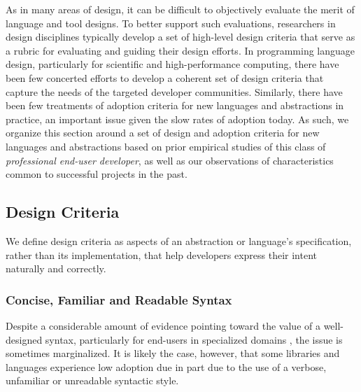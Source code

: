\documentclass[12pt]{article}
\begin{document}

As in many areas of design, it can be difficult to objectively evaluate the merit of language and tool designs. To better support such evaluations, researchers in design disciplines typically develop a set of high-level  design criteria that serve as a rubric for evaluating and guiding their design efforts. In programming language design, particularly for scientific and high-performance computing, there have been few concerted efforts to develop a coherent set of design criteria that capture the needs of the targeted developer communities. Similarly, there have been few treatments of adoption criteria for new languages and abstractions in practice, an important issue given the slow rates of adoption today. As such, we organize this section around a set of design and adoption criteria for new languages and abstractions based on prior empirical studies of this class of {\it professional end-user developer}, as well as our observations of characteristics common to successful projects in the past. 


\subsection{Design Criteria}
We define design criteria as aspects of an abstraction or language's specification, rather than its implementation, that help developers express their intent naturally and correctly.
 
\subsubsection{Concise, Familiar and Readable Syntax}\label{syntax}
Despite a considerable amount of evidence pointing toward the value of a well-designed syntax, particularly for end-users in specialized domains \cite{pane1996usability}, the issue is sometimes marginalized. It is likely the case, however, that some libraries and languages experience low adoption due in  part due to the use of a verbose, unfamiliar or unreadable syntactic style.
\end{document}
